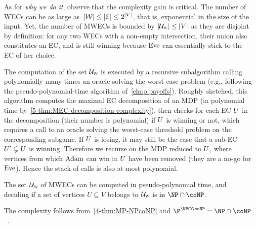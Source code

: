 As for \textit{why we do it}, observe that the complexity gain is critical. The number of WECs can be as large as~$\vert\mathcal{W}\vert \leq \vert\mathcal{E}\vert \leq 2^{\vert V\vert}$, that is, exponential in the size of the input. Yet, the number of MWECs is bounded by $\vert\mathcal{U}_{\textsc{w}}\vert \leq \vert V\vert$ as they are disjoint by definition: for any two WECs with a non-empty intersection, their union also constitutes an EC, and is still winning because $\text{Eve}$ can essentially stick to the EC of her choice.

The computation of the set $\mathcal{U}_{\textsc{w}}$ is executed by a recursive subalgorithm calling polynomially-many times an oracle solving the worst-case problem (e.g., following the pseudo-polynomial-time algorithm of~\cref{chap:payoffs}).  Roughly sketched, this algorithm computes the maximal EC decomposition of an MDP (in polynomial time by~\cref{5-thm:MEC-decomposition-complexity}), then checks for each EC $U$ in the decomposition (their number is polynomial) if $U$ is winning or not, which requires a call to an oracle solving the worst-case threshold problem on the corresponding subgame. If $U$ is losing, it may still be the case that a sub-EC $U' \subsetneq U$ is winning. Therefore we recurse on the MDP reduced to $U$, where vertices from which $\text{Adam}$ can win in $U$ have been removed (they are a no-go for $\text{Eve}$). Hence the stack of calls is also at most polynomial.

\begin{lemma}
\label{13-lem:MWEC}
The set $\mathcal{U}_{\textsc{w}}$ of MWECs can be computed in pseudo-polynomial time, and deciding if a set of vertices $U \subseteq V$ belongs to $\mathcal{U}_{\textsc{w}}$ is in $\NP \cap \coNP$.
\end{lemma}

The complexity follows from~\cref{4-thm:MP-NPcoNP} and $\P^{\NP \cap \coNP} = \NP \cap \coNP$~\cite{Brassard:1979}.

